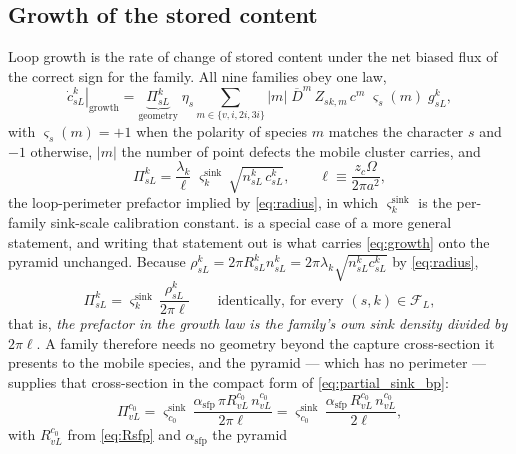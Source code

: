 \documentclass{article}
\begin{document}
\subsection{Growth of the stored content}
\label{sec:growth-laws}

Loop growth is the rate of change of stored content under the net biased flux of
the correct sign for the family. All nine families obey one law,
\begin{equation}
  \left.\dot c^k_{sL}\right|_{\mathrm{growth}}
  =\underbrace{\Pi^k_{sL}}_{\text{geometry}}\;\eta_s
   \sum_{m\in\{v,i,2i,3i\}}\!\!
   |m|\;\overline{D}^m\,Z_{sk,m}\,c^m\;\varsigma_{s}(m)\;g^k_{sL},
  \label{eq:growth}
\end{equation}
with $\varsigma_s(m)=+1$ when the polarity of species $m$ matches the character
$s$ and $-1$ otherwise, $|m|$ the number of point defects the mobile cluster
carries, and
\begin{equation}
  \Pi^k_{sL}=\frac{\lambda_k}{\ell}\;\varsigma^{\mathrm{sink}}_k\,
             \sqrt{n^k_{sL}\,c^k_{sL}},
  \qquad
  \ell\equiv\frac{z_c\Omega}{2\pi a^2},
  \label{eq:loopprefactor}
\end{equation}
the loop-perimeter prefactor implied by \cref{eq:radius}, in which
$\varsigma^{\mathrm{sink}}_k$ is the per-family sink-scale calibration constant.
 is a special case of a more general statement, and
writing that statement out is what carries \cref{eq:growth} onto the pyramid
unchanged. Because $\rho^k_{sL}=2\pi R^k_{sL}n^k_{sL}
=2\pi\lambda_k\sqrt{n^k_{sL}c^k_{sL}}$ by \cref{eq:radius},
\begin{equation}
  \Pi^k_{sL}=\varsigma^{\mathrm{sink}}_k\,\frac{\rho^k_{sL}}{2\pi\ell}
  \qquad\text{identically, for every }(s,k)\in\mathcal F_L,
  \label{eq:Pi-identity}
\end{equation}
that is, \emph{the prefactor in the growth law is the family's own sink density
divided by $2\pi\ell$}. A family therefore needs no geometry beyond the capture
cross-section it presents to the mobile species, and the pyramid --- which has no
perimeter --- supplies that cross-section in the compact form of
\cref{eq:partial_sink_bp}:
\begin{equation}
  \Pi^{c_0}_{vL}
  =\varsigma^{\mathrm{sink}}_{c_0}\,
    \frac{\alpha_{\mathrm{sfp}}\,\pi R^{c_0}_{vL}\,n^{c_0}_{vL}}{2\pi\ell}
  =\varsigma^{\mathrm{sink}}_{c_0}\,
    \frac{\alpha_{\mathrm{sfp}}\,R^{c_0}_{vL}\,n^{c_0}_{vL}}{2\ell},
  \label{eq:Pisfp}
\end{equation}
with $R^{c_0}_{vL}$ from \cref{eq:Rsfp} and $\alpha_{\mathrm{sfp}}$ the pyramid
\end{document}
